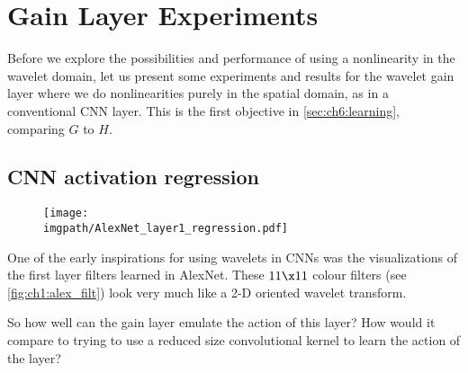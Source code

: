 \section{Gain Layer Experiments}\label{sec:ch6:gainlayer_experiments}
Before we explore the possibilities and performance of using a
nonlinearity in the wavelet domain, let us present some experiments and results
for the wavelet gain layer where we do nonlinearities purely in the
spatial domain, as in a conventional CNN layer. This is the first objective in
\autoref{sec:ch6:learning}, comparing $G$ to $H$.

\subsection{CNN activation regression}\label{sec:ch6:regression}
\begin{figure}[t]
  \centering
  \texttt{[image: \\imgpath/AlexNet\_layer1\_regression.pdf]}
  \label{fig:ch6:gainlayer_regression}
\end{figure}
One of the early inspirations for using wavelets in CNNs was the visualizations
of the first layer filters learned in AlexNet. These $11\x 11$ colour filters
(see \autoref{fig:ch1:alex_filt}) look very much like a 2-D oriented wavelet transform.

So how well can the gain layer emulate the action of this layer? How would it
compare to trying to use a reduced size convolutional kernel to learn the
action of the layer?

